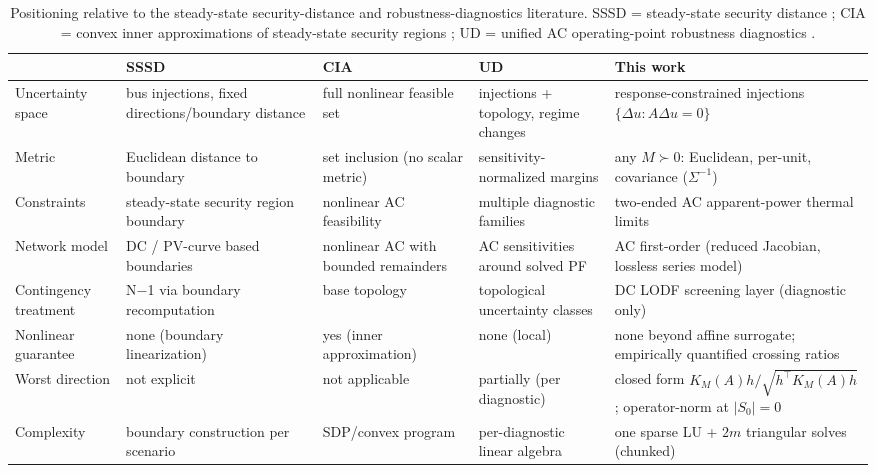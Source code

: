 \begin{table}[t]
\centering
\caption{Positioning relative to the steady-state security-distance and
robustness-diagnostics literature.  SSSD = steady-state security distance
\citep{ChenChenXiaKang2013,ChenChenXia2015Concept,ChenEtAl2015N1};
CIA = convex inner approximations of steady-state security regions
\citep{NguyenDvijothamTuritsyn2019}; UD = unified AC operating-point
robustness diagnostics \citep{AntonIlic2026Diagnostics}.
\label{tab:secdist}}
\scriptsize
\begin{tabularx}{\textwidth}{@{}lYYYY@{}}
\toprule
 & SSSD & CIA & UD & This work \\
\midrule
Uncertainty space & bus injections, fixed directions/boundary distance & full nonlinear feasible set & injections + topology, regime changes & response-constrained injections $\{\Delta u: A\Delta u=0\}$ \\
Metric & Euclidean distance to boundary & set inclusion (no scalar metric) & sensitivity-normalized margins & any $M\succ0$: Euclidean, per-unit, covariance ($\Sigma^{-1}$) \\
Constraints & steady-state security region boundary & nonlinear AC feasibility & multiple diagnostic families & two-ended AC apparent-power thermal limits \\
Network model & DC / PV-curve based boundaries & nonlinear AC with bounded remainders & AC sensitivities around solved PF & AC first-order (reduced Jacobian, lossless series model) \\
Contingency treatment & N$-$1 via boundary recomputation & base topology & topological uncertainty classes & DC LODF screening layer (diagnostic only) \\
Nonlinear guarantee & none (boundary linearization) & yes (inner approximation) & none (local) & none beyond affine surrogate; empirically quantified crossing ratios \\
Worst direction & not explicit & not applicable & partially (per diagnostic) & closed form $K_M(A)h/\sqrt{h^\top K_M(A)h}$; operator-norm at $|S_0|{=}0$ \\
Complexity & boundary construction per scenario & SDP/convex program & per-diagnostic linear algebra & one sparse LU + $2m$ triangular solves (chunked) \\
\bottomrule
\end{tabularx}
\end{table}

